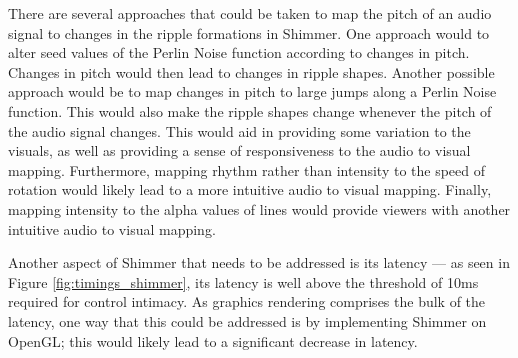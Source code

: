 \documentclass[../initial_thesis.tex]{subfiles}
\begin{document}
There are several approaches that could be taken to map the pitch of an audio signal to changes in the ripple formations in Shimmer. One approach would to alter seed values of the Perlin Noise function according to changes in pitch. Changes in pitch would then lead to changes in ripple shapes. Another possible approach would be to map changes in pitch to large jumps along a Perlin Noise function. This would also make the ripple shapes change whenever the pitch of the audio signal changes. This would aid in providing some variation to the visuals, as well as providing a sense of responsiveness to the audio to visual mapping. Furthermore, mapping rhythm rather than intensity to the speed of rotation would likely lead to a more intuitive audio to visual mapping. Finally, mapping intensity to the alpha values of lines would provide viewers with another intuitive audio to visual mapping.\par

Another aspect of Shimmer that needs to be addressed is its latency --- as seen in Figure \ref{fig:timings_shimmer}, its latency is well above the threshold of 10ms required for control intimacy. As graphics rendering comprises the bulk of the latency, one way that this could be addressed is by implementing Shimmer on OpenGL; this would likely lead to a significant decrease in latency.
\end{document}
